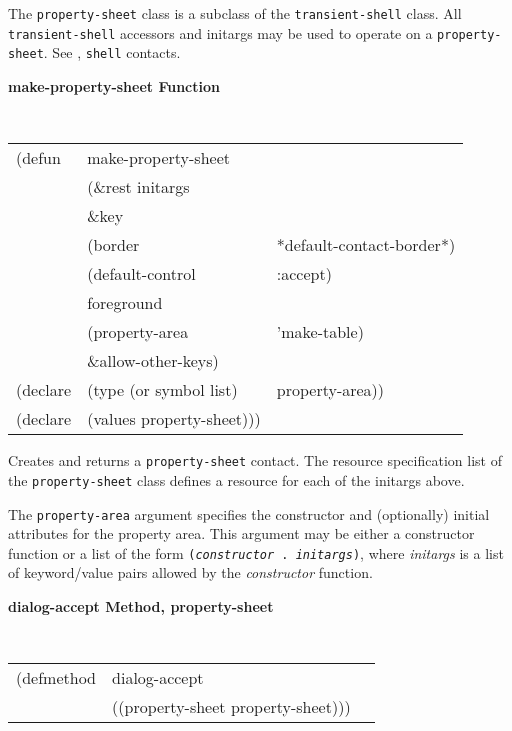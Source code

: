 
The {\tt property-sheet} class is a subclass of the {\tt transient-shell} class.
All {\tt transient-shell} accessors and initargs may be used to operate on a
{\tt property-sheet}.  See \cite{clue}, {\tt shell}
contacts.


{\samepage
{\large {\bf make-property-sheet \hfill Function}} 
\begin{flushright} \parbox[t]{6.125in}{
\tt
\begin{tabular}{lll}
\raggedright
(defun & make-property-sheet \\
       & (\&rest initargs \\
       & \&key  \\ 
       & (border                & *default-contact-border*) \\ 
       & (default-control       & :accept)\\
       & foreground \\
       & (property-area         & 'make-table)\\    
       & \&allow-other-keys) \\
(declare & (type (or symbol list)& property-area))\\
(declare & (values   property-sheet)))
\end{tabular}
\rm

}\end{flushright}}

\begin{flushright} \parbox[t]{6.125in}{
Creates and returns a {\tt property-sheet} contact.
The resource specification list of the {\tt property-sheet} class defines
a resource for each of the initargs above.

The {\tt property-area} argument specifies the constructor and (optionally)
initial attributes for the property area.  This argument
may be either a constructor function or a list of the form {\tt ({\em constructor}
.  {\em initargs})}, where {\em initargs} is a list of keyword/value pairs allowed
by the {\em constructor} function.

}\end{flushright}

{\samepage
{\large {\bf dialog-accept \hfill Method, property-sheet}}
\begin{flushright} \parbox[t]{6.125in}{
\tt
\begin{tabular}{lll}
\raggedright
(defmethod & dialog-accept & \\
& ((property-sheet  property-sheet)))
\end{tabular}
\rm

}\end{flushright}}


